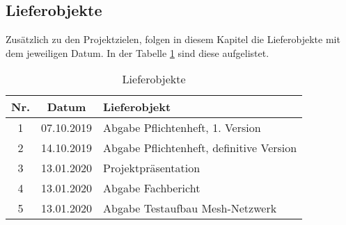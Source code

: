 \clearpage
\subsection{Lieferobjekte}\label{subsec:Lieferobjekte}
Zusätzlich zu den Projektzielen, folgen in diesem Kapitel die Lieferobjekte  mit dem jeweiligen Datum. In der Tabelle \ref{tbl:Lieferobjekte} sind diese  aufgelistet.  


\begin{table}[H]
     \centering
\begin{tabular}{|c|c|l|}\hline
   \textbf{Nr.} & \textbf{Datum} & \textbf{Lieferobjekt} \\ \hline
   
   1 & 07.10.2019 & Abgabe Pflichtenheft, 1. Version\\ \hline
   2 & 14.10.2019 & Abgabe Pflichtenheft, definitive Version\\ \hline
   3 & 13.01.2020 & Projektpräsentation \\ \hline
   4 & 13.01.2020 & Abgabe Fachbericht \\ \hline
   5 & 13.01.2020 & Abgabe Testaufbau Mesh-Netzwerk \\ \hline
   
   
   
 \end{tabular}
     \caption{Lieferobjekte}
     \label{tbl:Lieferobjekte}
\end{table}









